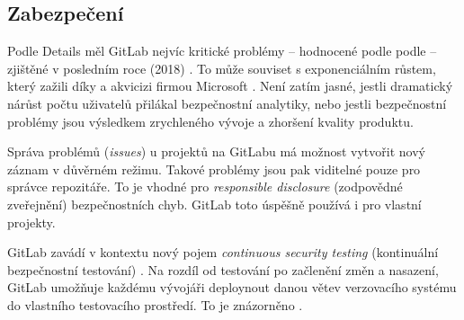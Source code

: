     \subsection{Zabezpečení}
        Podle  Details měl GitLab nejvíc kritické problémy -- hodnocené podle podle  -- zjištěné v posledním roce (2018) \cite{cve-gitlab}. To může souviset s exponenciálním růstem, který zažili díky  a akvicizi firmou Microsoft \cite{gitlab-growth}. Není zatím jasné, jestli dramatický nárůst počtu uživatelů přilákal bezpečnostní analytiky, nebo jestli bezpečnostní problémy jsou výsledkem zrychleného vývoje a zhoršení kvality produktu.


        Správa problémů (\textit{issues}) u projektů na GitLabu má možnost vytvořit nový záznam v důvěrném režimu. Takové problémy jsou pak viditelné pouze pro správce repozitáře. To je vhodné pro \textit{responsible disclosure} (zodpovědné zveřejnění) bezpečnostních chyb. GitLab toto úspěšně používá i pro vlastní projekty.

        GitLab zavádí v kontextu \CICD nový pojem \textit{continuous security testing} (kontinuální bezpečnostní testování) \cite{gitlab-app-security}. Na rozdíl od testování po začlenění změn a nasazení, GitLab umožňuje každému vývojáři deploynout danou větev verzovacího systému do vlastního testovacího prostředí. To je znázorněno .

